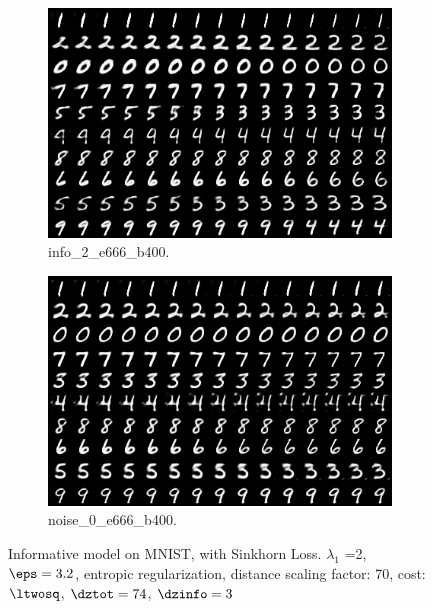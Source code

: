 \begin{figure}[!htbp]
\begin{subfigure}[t]{0.48\textwidth}
   \includegraphics[width=\textwidth,center]{2019-04-30/mnist/info/info_2_e666_b400.png}
   \caption{info_2_e666_b400.}
   \label{fig:.._.._notes_journal_figures_2019-04-30_mnist_info-c}
\end{subfigure}
\begin{subfigure}[t]{0.48\textwidth}
   \includegraphics[width=\textwidth,center]{2019-04-30/mnist/info/noise_0_e666_b400.png}
   \caption{noise_0_e666_b400.}
   \label{fig:.._.._notes_journal_figures_2019-04-30_mnist_info-d}
\end{subfigure}
   \caption{Informative model on MNIST, with Sinkhorn Loss. $\lambda_1$ =2, $\eps=3.2$, entropic regularization, distance scaling factor: 70, cost: $\ltwosq$, $\dztot = 74$, $\dzinfo = 3$}
   \label{fig:2019-04-30_mnist_info}
\end{figure}